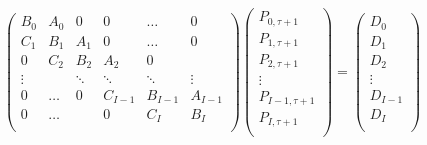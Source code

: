 \documentclass[10pt]{article}
\begin{document}
\begin{equation}
\begin{pmatrix}
    B_0    & A_0   & 0      & 0      & \dots  & 0       \\
    C_1    & B_1   & A_1    & 0      & \dots  & 0       \\
    0      & C_2   & B_2    & A_2    & 0      &         \\
    \vdots &       & \ddots & \ddots & \ddots & \vdots  \\
    0      & \dots & 0      & C_{I-1}& B_{I-1}& A_{I-1} \\
    0      & \dots &        & 0      & C_I    & B_I     \\
\end{pmatrix} 
\begin{pmatrix}
    P_{0,\tau+1}   \\
    P_{1,\tau+1}   \\
    P_{2,\tau+1}   \\
    \vdots         \\
    P_{I-1,\tau+1} \\
    P_{I,\tau+1}   \\
\end{pmatrix}
=
\begin{pmatrix}
    D_0     \\
    D_1     \\
    D_2     \\
    \vdots  \\
    D_{I-1} \\
    D_I     \\
\end{pmatrix}
\end{equation}
\end{document}
